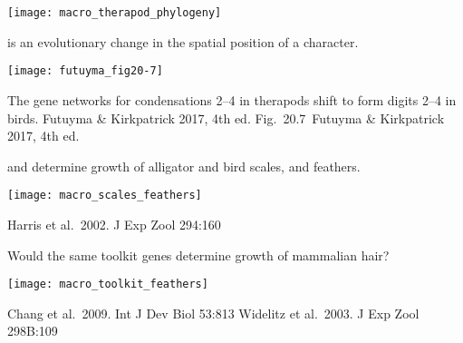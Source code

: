 \documentclass[t]{beamer}
\newcommand{\futuyma}[1]{%
	\ifthenelse{\isempty{#1}}%
	{Futuyma \& Kirkpatrick 2017, 4th ed.}%
	{Fig.~#1~Futuyma \& Kirkpatrick 2017, 4th ed.}%
}
\newcommand{\backskip}{\vspace{-0.5\baselineskip}}
\begin{document}

\begin{frame}

\centering

\texttt{[image: macro\_therapod\_phylogeny]}

\end{frame}


\begin{frame}{ is an evolutionary change in the spatial position of a character.}

{\centering

\texttt{[image: futuyma\_fig20-7]}
}

\hangpara The gene networks for condensations 2–4 in therapods shift to form digits 2–4 in birds.
\tinyfill \futuyma{20.7}

\end{frame}



\begin{frame}{ and  determine growth of alligator and bird scales, and feathers.}

\backskip

\texttt{[image: macro\_scales\_feathers]}


\tinyfill Harris et al.~2002. J Exp Zool 294:160

\end{frame}


\begin{frame}{Would the same toolkit genes determine growth of mammalian hair?}

\backskip

\texttt{[image: macro\_toolkit\_feathers]}

\vfilll

\tiny Chang et al.~2009. Int J Dev Biol 53:813
\hfill Widelitz et al.~2003. J Exp Zool 298B:109



\end{frame}



\end{document}
